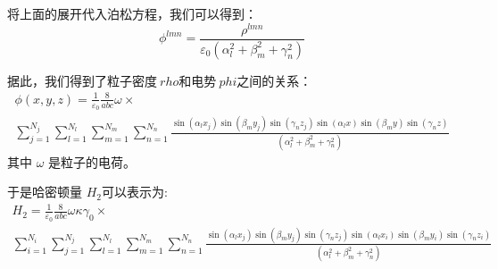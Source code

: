 将上面的展开代入泊松方程，我们可以得到：
\begin{equation}
{{\phi }^{lmn}}=\frac{{{\rho }^{lmn}}}{{{\varepsilon }_{0}}(\alpha _{l}^{2}+\beta _{m}^{2}+\gamma _{n}^{2})}
\end{equation}

据此，我们得到了粒子密度$ \ rho $和电势$ \ phi $之间的关系：
\begin{multline}
\phi (x,y,z)=\frac{1}{{{\varepsilon }_{0}}}\frac{8}{abc}\omega \times \\ \sum\limits_{j=1}^{{{N}_{j}}}{\sum\limits_{l=1}^{{{N}_{l}}}{\sum\limits_{m=1}^{{{N}_{m}}}{\sum\limits_{n=1}^{{{N}_{n}}}{\frac{\sin ({{\alpha }_{l}}{{x}_{j}})\sin ({{\beta }_{m}}{{y}_{j}})\sin ({{\gamma }_{n}}{{z}_{j}})\sin ({{\alpha }_{l}}x)\sin ({{\beta }_{m}}y)\sin ({{\gamma }_{n}}z)}{(\alpha _{l}^{2}+\beta _{m}^{2}+\gamma _{n}^{2})}}}}}
\end{multline}
其中 $\omega $ 是粒子的电荷。

于是哈密顿量 ${{H}_{2}}$可以表示为:
\begin{multline}
{{H}_{2}}=\frac{1}{{{\varepsilon }_{0}}}\frac{8}{abc}\omega \kappa {{\gamma}_{0}} \times \\
\sum\limits_{i=1}^{{{N}_{i}}}{\sum\limits_{j=1}^{{{N}_{j}}}{\sum\limits_{l=1}^{{{N}_{l}}}{\sum\limits_{m=1}^{{{N}_{m}}}{\sum\limits_{n=1}^{{{N}_{n}}}
{\frac{\sin ({{\alpha }_{l}}{{x}_{j}})\sin ({{\beta }_{m}}{{y}_{j}})\sin ({{\gamma }_{n}}{{z}_{j}})\sin ({{\alpha }_{l}}{{x}_{i}})\sin ({{\beta }_{m}}{{y}_{i}})\sin ({{\gamma }_{n}}{{z}_{i}})}{(\alpha _{l}^{2}+\beta _{m}^{2}+\gamma _{n}^{2})}}
}}}}
\end{multline}

